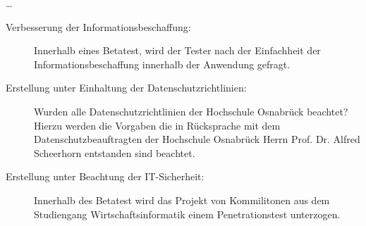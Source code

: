 	\ldots
	
	\clearpage
	
	\begin{description}
	\item[Verbesserung der Informationsbeschaffung:] Innerhalb eines Betatest, wird
	der Tester nach der Einfachheit der Informationsbeschaffung innerhalb der
	Anwendung gefragt.
	\item[Erstellung unter Einhaltung der Datenschutzrichtlinien:] Wurden alle
	Datenschutzrichtlinien  der Hochschule Osnabrück beachtet? Hierzu werden die
	Vorgaben die in Rücksprache  mit dem Datenschutzbeauftragten der Hochschule
	Osnabrück  Herrn Prof. Dr. Alfred Scheerhorn entstanden sind beachtet.
	\item[Erstellung unter Beachtung der IT-Sicherheit:] Innerhalb des Betatest
	wird das Projekt von Kommilitonen aus dem Studiengang Wirtschaftsinformatik
	einem Penetrationstest unterzogen.
\end{description}